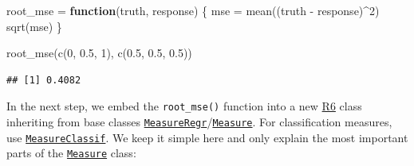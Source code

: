 \documentclass[
]{scrbook}
\newenvironment{Shaded}{\begin{snugshade}}{\end{snugshade}}
\newcommand{\ControlFlowTok}[1]{\textcolor[rgb]{0.13,0.29,0.53}{\textbf{#1}}}
\newcommand{\DecValTok}[1]{\textcolor[rgb]{0.00,0.00,0.81}{#1}}
\newcommand{\FloatTok}[1]{\textcolor[rgb]{0.00,0.00,0.81}{#1}}
\newcommand{\FunctionTok}[1]{\textcolor[rgb]{0.00,0.00,0.00}{#1}}
\newcommand{\NormalTok}[1]{#1}
\newcommand{\OtherTok}[1]{\textcolor[rgb]{0.56,0.35,0.01}{#1}}
\newcommand{\SpecialCharTok}[1]{\textcolor[rgb]{0.00,0.00,0.00}{#1}}
\renewenvironment{Shaded} {\begin{snugshade}\small} {\end{snugshade}}
\begin{document}
\begin{Shaded}
\begin{Highlighting}[]
\NormalTok{root\_mse }\OtherTok{=} \ControlFlowTok{function}\NormalTok{(truth, response) \{}
\NormalTok{  mse }\OtherTok{=} \FunctionTok{mean}\NormalTok{((truth }\SpecialCharTok{{-}}\NormalTok{ response)}\SpecialCharTok{\^{}}\DecValTok{2}\NormalTok{)}
  \FunctionTok{sqrt}\NormalTok{(mse)}
\NormalTok{\}}

\FunctionTok{root\_mse}\NormalTok{(}\FunctionTok{c}\NormalTok{(}\DecValTok{0}\NormalTok{, }\FloatTok{0.5}\NormalTok{, }\DecValTok{1}\NormalTok{), }\FunctionTok{c}\NormalTok{(}\FloatTok{0.5}\NormalTok{, }\FloatTok{0.5}\NormalTok{, }\FloatTok{0.5}\NormalTok{))}
\end{Highlighting}
\end{Shaded}

\begin{verbatim}
## [1] 0.4082
\end{verbatim}

In the next step, we embed the \texttt{root\_mse()} function into a new \href{https://cran.r-project.org/package=R6}{R6} class inheriting from base classes \href{https://mlr3.mlr-org.com/reference/MeasureRegr.html}{\texttt{MeasureRegr}}/\href{https://mlr3.mlr-org.com/reference/Measure.html}{\texttt{Measure}}.
For classification measures, use \href{https://mlr3.mlr-org.com/reference/MeasureClassif.html}{\texttt{MeasureClassif}}.
We keep it simple here and only explain the most important parts of the \href{https://mlr3.mlr-org.com/reference/Measure.html}{\texttt{Measure}} class:
\end{document}
